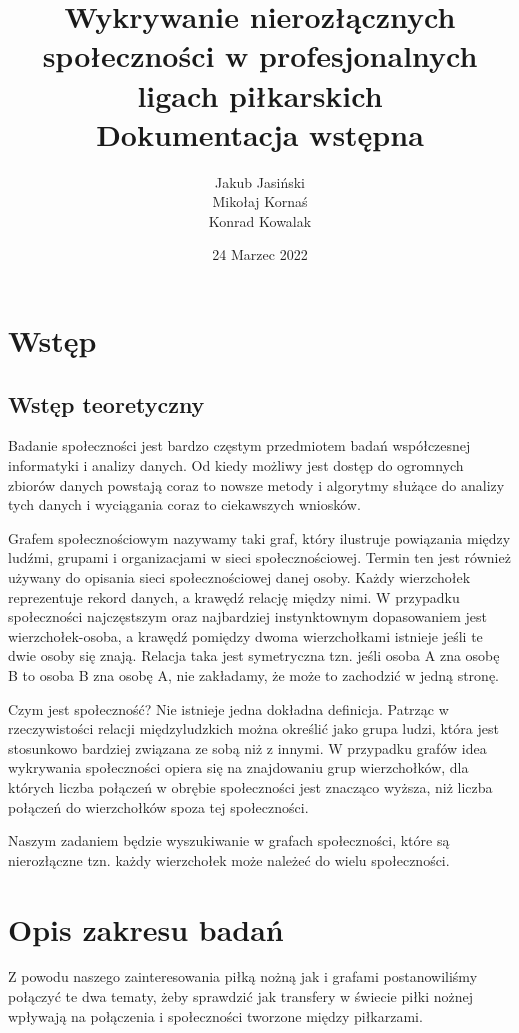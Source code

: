 \documentclass{article}
\title{Wykrywanie nierozłącznych społeczności w profesjonalnych ligach piłkarskich \\ Dokumentacja wstępna}
\author{Jakub Jasiński \\ Mikołaj Kornaś \\ Konrad Kowalak}
\date{24 Marzec 2022}
\begin{document}
\maketitle

\section{Wstęp}
\subsection{Wstęp teoretyczny}
Badanie społeczności jest bardzo częstym przedmiotem badań współczesnej informatyki i analizy danych. Od kiedy możliwy jest dostęp do ogromnych zbiorów danych powstają coraz to nowsze metody i algorytmy służące do analizy tych danych i wyciągania coraz to ciekawszych wniosków.

Grafem społecznościowym nazywamy taki graf, który ilustruje powiązania między ludźmi, grupami i organizacjami w sieci społecznościowej. Termin ten jest również używany do opisania sieci społecznościowej danej osoby. Każdy wierzchołek reprezentuje rekord danych, a krawędź relację między nimi. W przypadku społeczności najczęstszym oraz najbardziej instynktownym dopasowaniem jest wierzchołek-osoba, a krawędź pomiędzy dwoma wierzchołkami istnieje jeśli te dwie osoby się znają. Relacja taka jest symetryczna tzn. jeśli osoba A zna osobę B to osoba B zna osobę A, nie zakładamy, że może to zachodzić w jedną stronę.

Czym jest społeczność? Nie istnieje jedna dokładna definicja. Patrząc w rzeczywistości relacji międzyludzkich można określić jako grupa ludzi, która jest stosunkowo bardziej związana ze sobą niż z innymi. W przypadku grafów idea wykrywania społeczności opiera się na znajdowaniu grup
wierzchołków, dla których liczba połączeń w obrębie społeczności jest znacząco
wyższa, niż liczba połączeń do wierzchołków spoza tej społeczności.

Naszym zadaniem będzie wyszukiwanie w grafach społeczności, które są nierozłączne tzn. każdy wierzchołek może należeć do wielu społeczności.
\section{Opis zakresu badań}

Z powodu naszego zainteresowania piłką nożną jak i grafami postanowiliśmy połączyć te dwa tematy, żeby sprawdzić jak transfery w świecie piłki nożnej wpływają na połączenia i społeczności tworzone między piłkarzami.
\end{document}
